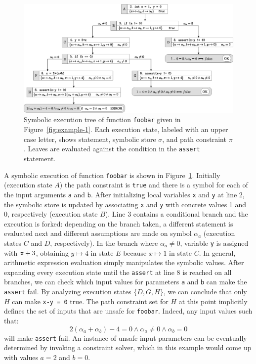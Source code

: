 \begin{figure}[t]
  \centering
  \includegraphics[width=1.0\columnwidth]{images/execution-tree.eps} 
  \caption{Symbolic execution tree of function {\tt foobar} given in Figure~\ref{fig:example-1}. Each execution state, labeled with an upper case letter, shows statement, symbolic store $\sigma$, and path constraint $\pi$. Leaves are evaluated against the condition in the {\tt assert} statement. }
  \label{fig:example-symbolic-execution}
\end{figure}

\noindent A symbolic execution of function {\tt foobar} is shown in Figure~\ref{fig:example-symbolic-execution}. Initially (execution state $A$) the path constraint is {\tt true} and there is a symbol for each of the input arguments {\tt a} and {\tt b}. 
After initializing local variables {\tt x} and {\tt y} at line 2, the symbolic store is updated by associating {\tt x} and {\tt y} with concrete values 1 and 0, respectively (execution state $B$). Line 3 contains a conditional branch and the execution is forked: depending on the branch taken, a different statement is evaluated next and different assumptions are made on symbol $\alpha_a$ (execution states $C$ and $D$, respectively). In the branch where $\alpha_a\neq 0$, variable {\tt y} is assigned with ${\tt x}+3$, obtaining $y\mapsto 4$ in state $E$ because $x\mapsto 1$ in state $C$. In general, arithmetic expression evaluation simply manipulates the symbolic values.
After expanding every execution state until the {\tt assert} at line 8 is reached on all branches, we can check which input values for parameters {\tt a} and {\tt b} can make the {\tt assert} fail. By analyzing execution states $\{D,G,H\}$, we can conclude that only $H$ can make {\tt x-y = 0} true. The path constraint set for $H$ at this point implicitly defines the set of inputs that are unsafe for {\tt foobar}. 
Indeed, any input values such that:
 \[ 2(\alpha_a+\alpha_b)-4 = 0 \wedge \alpha_a \neq 0 \wedge \alpha_b = 0 \]
will make {\tt assert} fail. An instance of unsafe input parameters can be eventually determined by invoking a constraint solver, which in this example would come up with values $a = 2$ and $b = 0$. 


